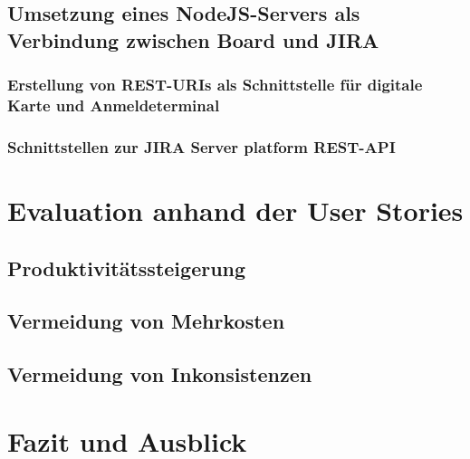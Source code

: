 \documentclass[12pt,titlepage]{scrartcl}
\begin{document}
		\subsection{Umsetzung eines NodeJS-Servers als Verbindung zwischen Board und JIRA} \label{implServer}
			\subsubsection{Erstellung von REST-URIs als Schnittstelle für digitale Karte und Anmeldeterminal} \label{ressourcenServer}
			\subsubsection{Schnittstellen zur JIRA Server platform REST-API}
			\newpage
	\section{Evaluation anhand der User Stories}
			\subsection{Produktivitätssteigerung}
			\subsection{Vermeidung von Mehrkosten}
			\subsection{Vermeidung von Inkonsistenzen}
	\newpage	
	\section{Fazit und Ausblick}
	\newpage

	

 	
\end{document}
